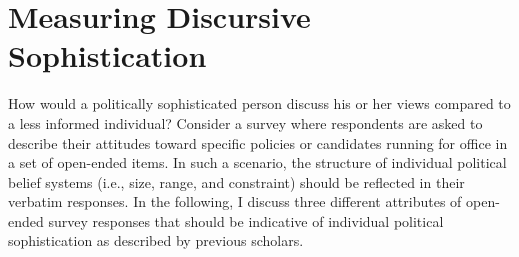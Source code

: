 \documentclass[12pt]{article}
\begin{document}
\section*{Measuring Discursive Sophistication}



How would a politically sophisticated person discuss his or her views compared to a less informed individual? Consider a survey where respondents are asked to describe their attitudes toward specific policies or candidates running for office in a set of open-ended items. In such a scenario, the structure of individual political belief systems (i.e., size, range, and constraint) should be reflected in their verbatim responses. In the following, I discuss three different attributes of open-ended survey responses that should be indicative of individual political sophistication as described by previous scholars.
\end{document}
